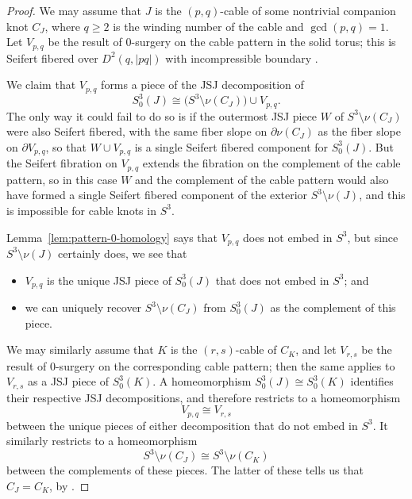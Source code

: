 \documentclass[11pt]{amsart}
\numberwithin{equation}{section}
\numberwithin{theorem}{section}
\theoremstyle{definition}
\begin{document}
\begin{proof}
We may assume that $J$ is the $(p,q)$-cable of some nontrivial companion knot $C_J$, where $q \geq 2$ is the winding number of the cable and $\gcd(p,q) = 1$.  Let $V_{p,q}$ be the result of $0$-surgery on the cable pattern in the solid torus; this is Seifert fibered over $D^2(q,|pq|)$ with incompressible boundary \cite[Lemma~7.2]{gordon}.

We claim that $V_{p,q}$ forms a piece of the JSJ decomposition of
\[ S^3_0(J) \cong \big( S^3 \setminus \nu(C_J) \big) \cup V_{p,q}. \]
The only way it could fail to do so is if the outermost JSJ piece $W$ of $S^3 \setminus \nu(C_J)$ were also Seifert fibered, with the same fiber slope on $\partial \nu(C_J)$ as the fiber slope on $\partial V_{p,q}$, so that $W \cup V_{p,q}$ is a single Seifert fibered component for $S^3_0(J)$.  But the Seifert fibration on $V_{p,q}$ extends the fibration on the complement of the cable pattern, so in this case $W$ and the complement of the cable pattern would also have formed a single Seifert fibered component of the exterior $S^3 \setminus \nu(J)$, and this is impossible for cable knots in $S^3$.

Lemma~\ref{lem:pattern-0-homology} says that $V_{p,q}$ does not embed in $S^3$, but since $S^3 \setminus \nu(J)$ certainly does, we see that
\begin{itemize}
\item $V_{p,q}$ is the unique JSJ piece of $S^3_0(J)$ that does not embed in $S^3$; and\vspace{1mm}
\item we can uniquely recover $S^3 \setminus \nu(C_J)$ from $S^3_0(J)$ as the complement of this piece.
\end{itemize}
We may similarly assume that $K$ is the $(r,s)$-cable of $C_K$, and let $V_{r,s}$ be the result of $0$-surgery on the corresponding cable pattern; then the same applies to $V_{r,s}$ as a JSJ piece of $S^3_0(K)$.  A homeomorphism $S^3_0(J) \cong S^3_0(K)$ identifies their respective JSJ decompositions, and therefore restricts to a homeomorphism
\[ V_{p,q} \cong V_{r,s} \]
between the unique pieces of either decomposition that do not embed in $S^3$. It similarly restricts to a homeomorphism
\[ S^3 \setminus \nu(C_J) \cong S^3 \setminus \nu(C_K) \]
between the complements of these pieces.  The latter of these tells us that $C_J = C_K$, by \cite{gordon-luecke-complement}.


\end{proof}
\end{document}
